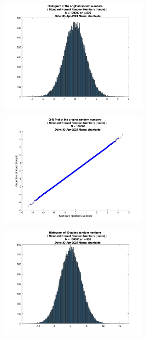\begin{figure}
	\centering
	\begin{subfigure}{0.48\linewidth}
		\centering
		\includegraphics[width=0.8\textwidth]{src/figures/cl-standard-normal/cl_original_randn_hist_N=100000_nn=500.jpg}
		\label{fig:cl-standard-normal-original}
	\end{subfigure}
	\begin{subfigure}{0.48\linewidth}
		\centering
		\includegraphics[width=0.8\textwidth]{src/figures/cl-standard-normal/cl_original_randn_qqpl_N=100000.jpg}
		\label{fig:cl-standard-normal-original-qqpl}
	\end{subfigure}
	\begin{subfigure}{0.48\linewidth}
		\centering
		\includegraphics[width=0.8\textwidth]{src/figures/cl-standard-normal/cl_added_randn_hist_N=100000_nn=500.jpg}

\end{subfigure}
\end{figure}
